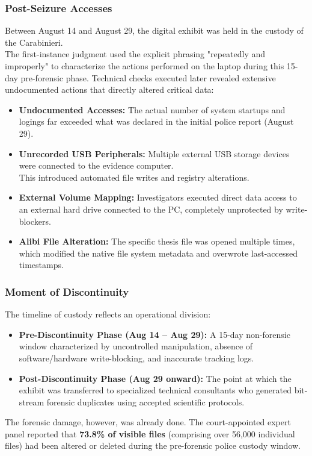 \subsubsection*{Post-Seizure Accesses}
Between August 14 and August 29, the digital exhibit was held in the custody of the Carabinieri. \\
The first-instance judgment used the explicit phrasing "repeatedly and improperly" to characterize the actions performed on the laptop during this 15-day pre-forensic phase. Technical checks executed later revealed extensive undocumented actions that directly altered critical data:
\begin{itemize}
    \item \textbf{Undocumented Accesses:} The actual number of system startups and logings far exceeded what was declared in the initial police report (August 29).
    \item \textbf{Unrecorded USB Peripherals:} Multiple external USB storage devices were connected to the evidence computer.\\
    This introduced automated file writes and registry alterations.
    \item \textbf{External Volume Mapping:} Investigators executed direct data access to an external hard drive connected to the PC, completely unprotected by write-blockers.
    \item \textbf{Alibi File Alteration:} The specific thesis file was opened multiple times, which modified the native file system metadata and overwrote last-accessed timestamps.
\end{itemize}

\subsubsection*{Moment of Discontinuity}
The timeline of custody reflects an  operational division:
\begin{itemize}
    \item \textbf{Pre-Discontinuity Phase (Aug 14 – Aug 29):} A 15-day non-forensic window characterized by uncontrolled manipulation, absence of software/hardware write-blocking, and inaccurate tracking logs.
    \item \textbf{Post-Discontinuity Phase (Aug 29 onward):} The point at which the exhibit was transferred to specialized technical consultants who generated bit-stream forensic duplicates using accepted scientific protocols.
\end{itemize}
The forensic damage, however, was already done. The court-appointed expert panel reported that \textbf{73.8\% of visible files} (comprising over 56,000 individual files) had been altered or deleted during the pre-forensic police custody window.

